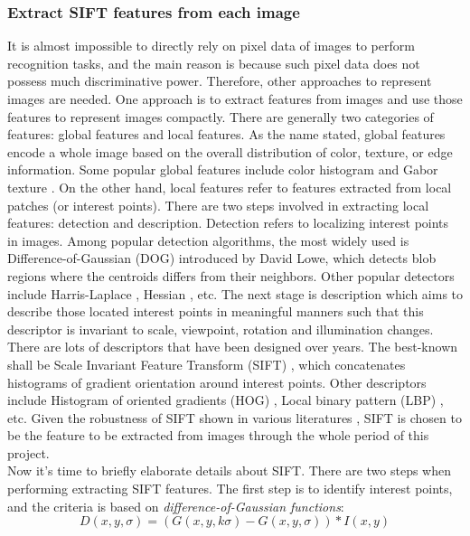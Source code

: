 \subsubsection{Extract SIFT features from each image}
It is almost impossible to directly rely on pixel data of images to perform recognition tasks, and the main reason is because such pixel data does not possess much discriminative power. Therefore, other approaches to represent images are needed. One approach is to extract features from images and use those features to represent images compactly. There are generally two categories of features: global features and local features. As the name stated, global features encode a whole image based on the overall distribution of color, texture, or edge information. Some popular global features include color histogram and Gabor texture \cite{manjunath1996texture}. On the other hand, local features refer to features extracted from local patches (or interest points). There are two steps involved in extracting local features: detection and description. Detection refers to localizing interest points in images. Among popular detection algorithms, the most widely used is Difference-of-Gaussian (DOG) \cite{lowe2004distinctive} introduced by David Lowe, which detects blob regions where the centroids differs from their neighbors. Other popular detectors include Harris-Laplace \cite{lindeberg1998feature}, Hessian \cite{mikolajczyk2004scale}, etc. The next stage is description which aims to describe those located interest points in meaningful manners such that this descriptor is invariant to scale, viewpoint, rotation and illumination changes. There are lots of descriptors that have been designed over years. The best-known shall be Scale Invariant Feature Transform (SIFT) \cite{lowe2004distinctive}, which concatenates histograms of gradient orientation around interest points. Other descriptors include Histogram of oriented gradients (HOG) \cite{dalal2005histograms}, Local binary pattern (LBP) \cite{ojala2002multiresolution}, etc. Given the robustness of SIFT shown in various literatures \cite{duan2012visual,zhou2008sift,lazebnik2006beyond, lowe2004distinctive}, SIFT is chosen to be the feature to be extracted from images through the whole period of this project.\\

\noindent Now it's time to briefly elaborate details about SIFT. There are two steps when performing extracting SIFT features. The first step is to identify interest points, and the criteria is based on {\em difference-of-Gaussian functions}:
\begin{equation}
D(x, y, \sigma) = (G(x, y, k\sigma) - G(x, y, \sigma)) * I(x, y)
\end{equation}


